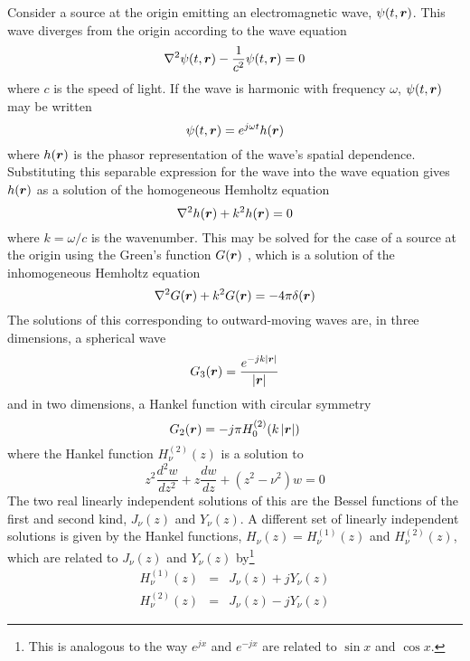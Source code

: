 Consider a source at the origin emitting an electromagnetic wave, 
$\psi(t,\bm{r})$.  This wave diverges from the origin according to the wave
equation
\begin{equation}
\nabla^2\psi(t,\bm{r})-\frac{1}{c^2}\psi(t,\bm{r})=0
\end{equation}
where $c$ is the speed of light.  If the wave is harmonic with frequency
$\omega$, $\psi(t,\bm{r})$ may be written
\begin{equation}
\psi(t,\bm{r})=e^{j\omega t}h(\bm{r})
\end{equation}
where $h(\bm{r})$ is the phasor representation of the wave's 
spatial dependence.  Substituting this separable expression for the wave
into the wave equation gives $h(\bm{r})$ as a solution of the
homogeneous Hemholtz equation
\begin{equation}
\nabla^2h(\bm{r})+k^2 h(\bm{r})=0
\end{equation}
where $k=\omega/c$ is the wavenumber.  This may be solved for the
case of a source at the origin using the Green's function $G(\bm{r})$
\cite[Ch. 7]{Mor53a}, which is a solution of the inhomogeneous Hemholtz
equation
\begin{equation}
\nabla^2G(\bm{r})+k^2G(\bm{r})=-4\pi\delta(\bm{r})
\end{equation}
The solutions of this corresponding to outward-moving waves are, in three
dimensions, a spherical wave
\begin{equation}
G_3(\bm{r})=\frac{\displaystyle e^{-jk\left|\bm{r}\right|}}{\left|\bm{r}\right|}
\end{equation}
and in two dimensions, a Hankel function with circular symmetry
\begin{equation}\label{ii eqn:2D gf}
G_2(\bm{r})=-j\pi H_0^{(2)}(k\left|\bm{r}\right|)
\end{equation}
where the Hankel function $H_{\nu}^{(2)}(z)$ is a solution to 
\begin{equation}
z^2\frac{d^2w}{dz^2}+z\frac{dw}{dz}+(z^2-\nu^2)w=0
\end{equation}
The two real linearly independent solutions of this are the Bessel functions
of the first and second kind, $J_{\nu}(z)$ and $Y_{\nu}(z)$.  A different
set of linearly independent solutions is given by the Hankel functions,
$H_{\nu}(z)=H_{\nu}^{(1)}(z)$ and $H_{\nu}^{(2)}(z)$, which are related to
$J_{\nu}(z)$ and $Y_{\nu}(z)$ by\footnote{This is analogous to the way
$e^{jx}$ and $e^{-jx}$ are related to $\sin x$ and $\cos x$.} \cite{Abr65}
\begin{eqnarray}
H_{\nu}^{(1)}(z)&=&J_{\nu}(z)+jY_{\nu}(z)\\
H_{\nu}^{(2)}(z)&=&J_{\nu}(z)-jY_{\nu}(z)
\end{eqnarray}


